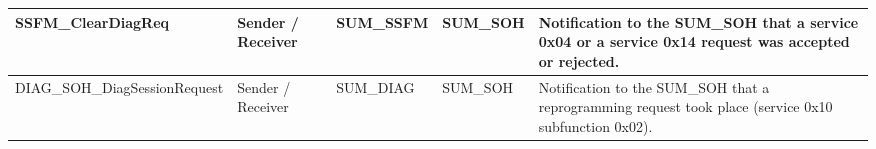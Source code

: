 \begin{longtable}{|l|l|l|l|l|}
\begin{minipage}{0.42\linewidth}\raggedright\vspace{.75ex}SSFM\_ClearDiagReq\vspace{.75ex}\end{minipage} & \begin{minipage}{0.07\linewidth}\raggedright\vspace{.75ex}Sender / Receiver\vspace{.75ex}\end{minipage} & \begin{minipage}{0.10\linewidth}\raggedright\vspace{.75ex}SUM\_SSFM\vspace{.75ex}\end{minipage} & \begin{minipage}{0.10\linewidth}\raggedright\vspace{.75ex}SUM\_SOH\vspace{.75ex}\end{minipage} & \begin{minipage}{0.17\linewidth}\raggedright\vspace{.75ex}Notification to the SUM\_SOH that a service 0x04 or a service 0x14 request was accepted or rejected.\vspace{.75ex}\end{minipage}\\\hline
\begin{minipage}{0.42\linewidth}\raggedright\vspace{.75ex}DIAG\_SOH\_DiagSessionRequest\vspace{.75ex}\end{minipage} & \begin{minipage}{0.07\linewidth}\raggedright\vspace{.75ex}Sender / Receiver\vspace{.75ex}\end{minipage} & \begin{minipage}{0.10\linewidth}\raggedright\vspace{.75ex}SUM\_DIAG\vspace{.75ex}\end{minipage} & \begin{minipage}{0.10\linewidth}\raggedright\vspace{.75ex}SUM\_SOH\vspace{.75ex}\end{minipage} & \begin{minipage}{0.17\linewidth}\raggedright\vspace{.75ex}Notification to the SUM\_SOH that a reprogramming request took place (service 0x10 subfunction 0x02).\vspace{.75ex}\end{minipage}\\\hline

\end{longtable}
